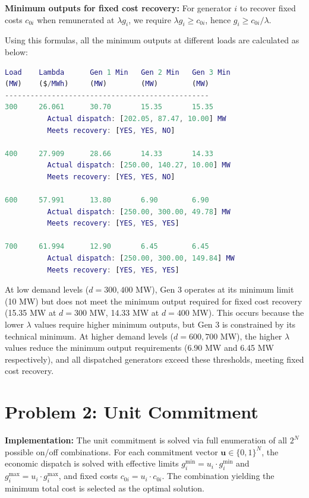 \documentclass{article}
\begin{document}
\textbf{Minimum outputs for fixed cost recovery:} For generator $i$ to recover fixed costs $c_{0i}$ when remunerated at $\lambda g_i$, we require $\lambda g_i \geq c_{0i}$, hence $g_i \geq c_{0i}/\lambda$. 

Using this formulas, all the minimum outputs at different loads are calculated as below:

\begin{lstlisting}[language=Matlab]
Load    Lambda      Gen 1 Min   Gen 2 Min   Gen 3 Min   
(MW)    ($/MWh)     (MW)        (MW)        (MW)        
------------------------------------------------
300     26.061      30.70       15.35       15.35       
          Actual dispatch: [202.05, 87.47, 10.00] MW
          Meets recovery: [YES, YES, NO]

400     27.909      28.66       14.33       14.33       
          Actual dispatch: [250.00, 140.27, 10.00] MW
          Meets recovery: [YES, YES, NO]

600     57.991      13.80       6.90        6.90        
          Actual dispatch: [250.00, 300.00, 49.78] MW
          Meets recovery: [YES, YES, YES]

700     61.994      12.90       6.45        6.45        
          Actual dispatch: [250.00, 300.00, 149.84] MW
          Meets recovery: [YES, YES, YES]
\end{lstlisting}


At low demand levels ($d=300,400$ MW), Gen 3 operates at its minimum limit (10 MW) but does not meet the minimum output required for fixed cost recovery (15.35 MW at $d=300$ MW, 14.33 MW at $d=400$ MW). This occurs because the lower $\lambda$ values require higher minimum outputs, but Gen 3 is constrained by its technical minimum. At higher demand levels ($d=600,700$ MW), the higher $\lambda$ values reduce the minimum output requirements (6.90 MW and 6.45 MW respectively), and all dispatched generators exceed these thresholds, meeting fixed cost recovery.


\newpage
\section*{Problem 2: Unit Commitment}

\textbf{Implementation:} The unit commitment is solved via full enumeration of all $2^N$ possible on/off combinations. For each commitment vector $\mathbf{u} \in \{0,1\}^N$, the economic dispatch is solved with effective limits $g_i^{\min} = u_i \cdot g_i^{\min}$ and $g_i^{\max} = u_i \cdot g_i^{\max}$, and fixed costs $c_{0i} = u_i \cdot c_{0i}$. The combination yielding the minimum total cost is selected as the optimal solution.
\end{document}
